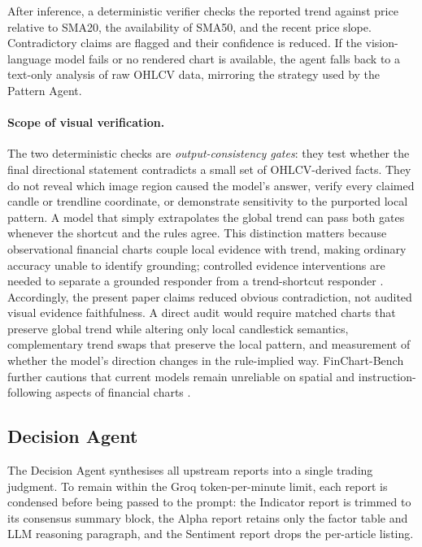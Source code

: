 After inference, a deterministic verifier checks the reported trend against price relative to SMA20, the availability of SMA50, and the recent price slope. Contradictory claims are flagged and their confidence is reduced. If the vision-language model fails or no rendered chart is available, the agent falls back to a text-only analysis of raw OHLCV data, mirroring the strategy used by the Pattern Agent.

\paragraph{Scope of visual verification.}
The two deterministic checks are \emph{output-consistency gates}: they test whether the final directional statement contradicts a small set of OHLCV-derived facts. They do not reveal which image region caused the model's answer, verify every claimed candle or trendline coordinate, or demonstrate sensitivity to the purported local pattern. A model that simply extrapolates the global trend can pass both gates whenever the shortcut and the rules agree. This distinction matters because observational financial charts couple local evidence with trend, making ordinary accuracy unable to identify grounding; controlled evidence interventions are needed to separate a grounded responder from a trend-shortcut responder \cite{wang2026martingale}. Accordingly, the present paper claims reduced obvious contradiction, not audited visual evidence faithfulness. A direct audit would require matched charts that preserve global trend while altering only local candlestick semantics, complementary trend swaps that preserve the local pattern, and measurement of whether the model's direction changes in the rule-implied way. FinChart-Bench further cautions that current models remain unreliable on spatial and instruction-following aspects of financial charts \cite{shu2026finchart}.


\subsection{Decision Agent}

The Decision Agent synthesises all upstream reports into a single trading judgment. To remain within the Groq token-per-minute limit, each report is condensed before being passed to the prompt: the Indicator report is trimmed to its consensus summary block, the Alpha report retains only the factor table and LLM reasoning paragraph, and the Sentiment report drops the per-article listing.


